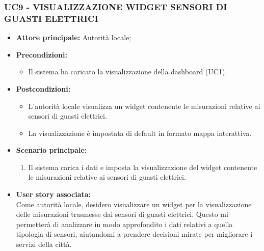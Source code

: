 \subsubsection{UC9 - VISUALIZZAZIONE WIDGET SENSORI DI GUASTI ELETTRICI}
\begin{itemize}
    \item \textbf{Attore principale:} Autorità locale;
    \item \textbf{Precondizioni:}
        \begin{itemize}
            \item Il sistema ha caricato la visualizzazione della dashboard (UC1).
        \end{itemize}
    \item \textbf{Postcondizioni:}
        \begin{itemize}
            \item L'autorità locale visualizza un widget contenente le misurazioni relative ai sensori di guasti elettrici.
            \item La visualizzazione è impostata di default in formato mappa interattiva.
        \end{itemize}
    \item \textbf{Scenario principale:}
        \begin{enumerate}
            \item Il sistema carica i dati e imposta la visualizzazione del widget contenente le misurazioni relative ai sensori di guasti elettrici.
        \end{enumerate}
    \item \textbf{User story associata:} \\
        Come autorità locale, desidero visualizzare un widget per la visualizzazione delle misurazioni trasmesse dai sensori di guasti elettrici. Questo mi permetterà di analizzare in modo approfondito i dati relativi a quella tipologia di sensori, aiutandomi a prendere decisioni mirate per migliorare i servizi della città.
\end{itemize}